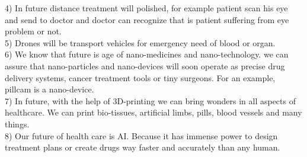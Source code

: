 \documentclass[12pt]{article}
\begin{document}
4) In future distance treatment will polished, for example patient scan his eye and send to doctor and doctor can recognize that is patient suffering from eye problem or not.\\

5) Drones will be transport vehicles for emergency need of blood or organ.\\

6) We know that future is age of nano-medicines and nano-technology. we can assure that nano-particles and nano-devices will soon operate as precise drug delivery systems, cancer treatment tools or tiny surgeons. For an example, pillcam is a nano-device.\\

7) In future, with the help of 3D-printing we can bring wonders in all aspects of healthcare. We can print bio-tissues, artificial limbs, pills, blood vessels and many things. \\

8) Our future of health care is AI. Because it has immense power to design treatment plans or create drugs way faster and accurately than any human.  
\end{document}
